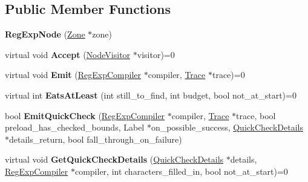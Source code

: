 \subsection*{Public Member Functions}
\begin{DoxyCompactItemize}
\item 
\hypertarget{classv8_1_1internal_1_1_reg_exp_node_add9600e01845a3ef14f42ab18177ca3c}{}{\bfseries Reg\+Exp\+Node} (\hyperlink{classv8_1_1internal_1_1_zone}{Zone} $\ast$zone)\label{classv8_1_1internal_1_1_reg_exp_node_add9600e01845a3ef14f42ab18177ca3c}

\item 
\hypertarget{classv8_1_1internal_1_1_reg_exp_node_ac6b89282f32103ee66d71780f738350b}{}virtual void {\bfseries Accept} (\hyperlink{classv8_1_1internal_1_1_node_visitor}{Node\+Visitor} $\ast$visitor)=0\label{classv8_1_1internal_1_1_reg_exp_node_ac6b89282f32103ee66d71780f738350b}

\item 
\hypertarget{classv8_1_1internal_1_1_reg_exp_node_ab9cd401dec1ad113895eab29871317c6}{}virtual void {\bfseries Emit} (\hyperlink{classv8_1_1internal_1_1_reg_exp_compiler}{Reg\+Exp\+Compiler} $\ast$compiler, \hyperlink{classv8_1_1internal_1_1_trace}{Trace} $\ast$trace)=0\label{classv8_1_1internal_1_1_reg_exp_node_ab9cd401dec1ad113895eab29871317c6}

\item 
\hypertarget{classv8_1_1internal_1_1_reg_exp_node_aea14efd681709d8fd872361f05c4abf8}{}virtual int {\bfseries Eats\+At\+Least} (int still\+\_\+to\+\_\+find, int budget, bool not\+\_\+at\+\_\+start)=0\label{classv8_1_1internal_1_1_reg_exp_node_aea14efd681709d8fd872361f05c4abf8}

\item 
\hypertarget{classv8_1_1internal_1_1_reg_exp_node_a3a6f3e45812374eb71e6ae389064709b}{}bool {\bfseries Emit\+Quick\+Check} (\hyperlink{classv8_1_1internal_1_1_reg_exp_compiler}{Reg\+Exp\+Compiler} $\ast$compiler, \hyperlink{classv8_1_1internal_1_1_trace}{Trace} $\ast$trace, bool preload\+\_\+has\+\_\+checked\+\_\+bounds, Label $\ast$on\+\_\+possible\+\_\+success, \hyperlink{classv8_1_1internal_1_1_quick_check_details}{Quick\+Check\+Details} $\ast$details\+\_\+return, bool fall\+\_\+through\+\_\+on\+\_\+failure)\label{classv8_1_1internal_1_1_reg_exp_node_a3a6f3e45812374eb71e6ae389064709b}

\item 
\hypertarget{classv8_1_1internal_1_1_reg_exp_node_add5e1fa780c60d5b3a910c00ed713ff6}{}virtual void {\bfseries Get\+Quick\+Check\+Details} (\hyperlink{classv8_1_1internal_1_1_quick_check_details}{Quick\+Check\+Details} $\ast$details, \hyperlink{classv8_1_1internal_1_1_reg_exp_compiler}{Reg\+Exp\+Compiler} $\ast$compiler, int characters\+\_\+filled\+\_\+in, bool not\+\_\+at\+\_\+start)=0\label{classv8_1_1internal_1_1_reg_exp_node_add5e1fa780c60d5b3a910c00ed713ff6}


\end{DoxyCompactItemize}
